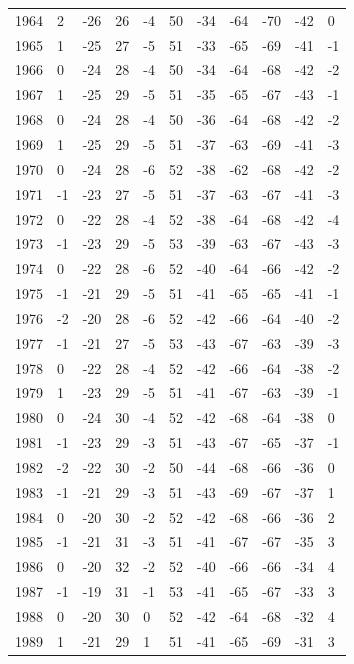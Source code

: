 \begin{table}[H]
\begin{tabular}{lllllllllll}
1964 & 2 & -26 & 26 & -4 & 50 & -34 & -64 & -70 & -42 & 0 \\
1965 & 1 & -25 & 27 & -5 & 51 & -33 & -65 & -69 & -41 & -1 \\
1966 & 0 & -24 & 28 & -4 & 50 & -34 & -64 & -68 & -42 & -2 \\
1967 & 1 & -25 & 29 & -5 & 51 & -35 & -65 & -67 & -43 & -1 \\
1968 & 0 & -24 & 28 & -4 & 50 & -36 & -64 & -68 & -42 & -2 \\
1969 & 1 & -25 & 29 & -5 & 51 & -37 & -63 & -69 & -41 & -3 \\
1970 & 0 & -24 & 28 & -6 & 52 & -38 & -62 & -68 & -42 & -2 \\
1971 & -1 & -23 & 27 & -5 & 51 & -37 & -63 & -67 & -41 & -3 \\
1972 & 0 & -22 & 28 & -4 & 52 & -38 & -64 & -68 & -42 & -4 \\
1973 & -1 & -23 & 29 & -5 & 53 & -39 & -63 & -67 & -43 & -3 \\
1974 & 0 & -22 & 28 & -6 & 52 & -40 & -64 & -66 & -42 & -2 \\
1975 & -1 & -21 & 29 & -5 & 51 & -41 & -65 & -65 & -41 & -1 \\
1976 & -2 & -20 & 28 & -6 & 52 & -42 & -66 & -64 & -40 & -2 \\
1977 & -1 & -21 & 27 & -5 & 53 & -43 & -67 & -63 & -39 & -3 \\
1978 & 0 & -22 & 28 & -4 & 52 & -42 & -66 & -64 & -38 & -2 \\
1979 & 1 & -23 & 29 & -5 & 51 & -41 & -67 & -63 & -39 & -1 \\
1980 & 0 & -24 & 30 & -4 & 52 & -42 & -68 & -64 & -38 & 0 \\
1981 & -1 & -23 & 29 & -3 & 51 & -43 & -67 & -65 & -37 & -1 \\
1982 & -2 & -22 & 30 & -2 & 50 & -44 & -68 & -66 & -36 & 0 \\
1983 & -1 & -21 & 29 & -3 & 51 & -43 & -69 & -67 & -37 & 1 \\
1984 & 0 & -20 & 30 & -2 & 52 & -42 & -68 & -66 & -36 & 2 \\
1985 & -1 & -21 & 31 & -3 & 51 & -41 & -67 & -67 & -35 & 3 \\
1986 & 0 & -20 & 32 & -2 & 52 & -40 & -66 & -66 & -34 & 4 \\
1987 & -1 & -19 & 31 & -1 & 53 & -41 & -65 & -67 & -33 & 3 \\
1988 & 0 & -20 & 30 & 0 & 52 & -42 & -64 & -68 & -32 & 4 \\
1989 & 1 & -21 & 29 & 1 & 51 & -41 & -65 & -69 & -31 & 3 \\

\end{tabular}
\end{table}
